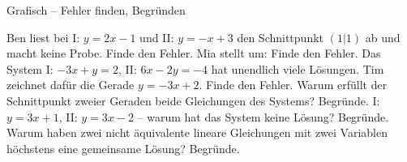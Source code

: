\begin{aufgabe}{Grafisch – Fehler finden, Begründen}
\begin{teile}
\teil Ben liest bei I: $y = 2x - 1$ und II: $y = -x + 3$ den Schnittpunkt $(1|1)$ ab und macht keine Probe. Finde den Fehler.
\teil Mia stellt um:  Finde den Fehler.
\teil Das System I: $-3x + y = 2$, II: $6x - 2y = -4$ hat unendlich viele Lösungen. Tim zeichnet dafür die Gerade $y = -3x + 2$. Finde den Fehler.
\teil Warum erfüllt der Schnittpunkt zweier Geraden beide Gleichungen des Systems? Begründe.
\teil I: $y = 3x + 1$, II: $y = 3x - 2$ – warum hat das System keine Lösung? Begründe.
\teil Warum haben zwei nicht äquivalente lineare Gleichungen mit zwei Variablen höchstens eine gemeinsame Lösung? Begründe.
\end{teile}
\end{aufgabe}
